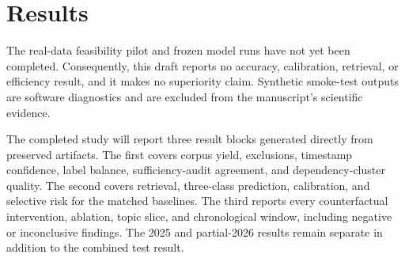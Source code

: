 \section{Results}

The real-data feasibility pilot and frozen model runs have not yet been completed. Consequently, this draft reports no accuracy, calibration, retrieval, or efficiency result, and it makes no superiority claim. Synthetic smoke-test outputs are software diagnostics and are excluded from the manuscript's scientific evidence.

The completed study will report three result blocks generated directly from preserved artifacts. The first covers corpus yield, exclusions, timestamp confidence, label balance, sufficiency-audit agreement, and dependency-cluster quality. The second covers retrieval, three-class prediction, calibration, and selective risk for the matched baselines. The third reports every counterfactual intervention, ablation, topic slice, and chronological window, including negative or inconclusive findings. The 2025 and partial-2026 results remain separate in addition to the combined test result.





